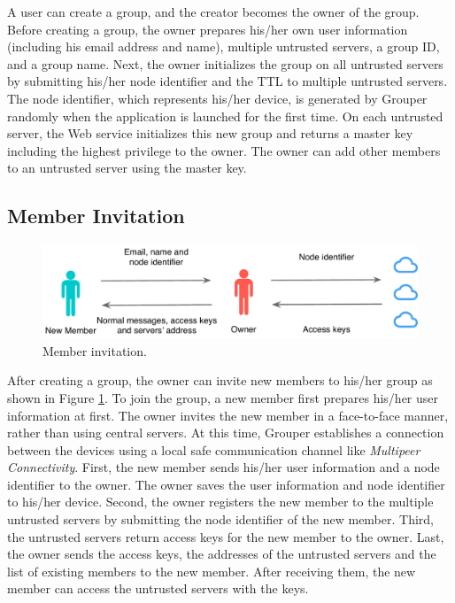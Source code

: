 \documentclass[a4paper,11pt]{report}
\begin{document}
A user can create a group, and the creator becomes the owner of the group.  
Before creating a group, the owner prepares his/her own user information (including his email address and name), multiple untrusted servers, a group ID, and a group name. 
Next, the owner initializes the group on all untrusted servers by submitting his/her node identifier and the TTL to multiple untrusted servers. 
The node identifier, which represents his/her device, is generated by Grouper randomly when the application is launched for the first time. 
On each untrusted server, the Web service initializes this new group and returns a master key including the highest privilege to the owner. 
The owner can add other members to an untrusted server using the master key.

\subsection{Member Invitation}

\begin{figure}
	\centering
	\includegraphics[scale=0.55]{add_member}
	\caption{Member invitation.}
	\label{fig:add_member}
\end{figure}

After creating a group, the owner can invite new members to his/her group as shown in Figure \ref{fig:add_member}. 
To join the group, a new member first prepares his/her user information at first. 
The owner invites the new member in a face-to-face manner, rather than using central servers. 
At this time, Grouper establishes a connection between the devices using a local safe communication channel like \emph{Multipeer Connectivity}\cite{mc}. 
First, the new member sends his/her user information and a node identifier to the owner. 
The owner saves the user information and node identifier to his/her device. 
Second, the owner registers the new member to the multiple untrusted servers by submitting the node identifier of the new member. 
Third, the untrusted servers return access keys for the new member to the owner. 
Last, the owner sends the access keys, the addresses of the untrusted servers and the list of existing members to the new member. 
After receiving them, the new member can access the untrusted servers with the keys.
\end{document}
